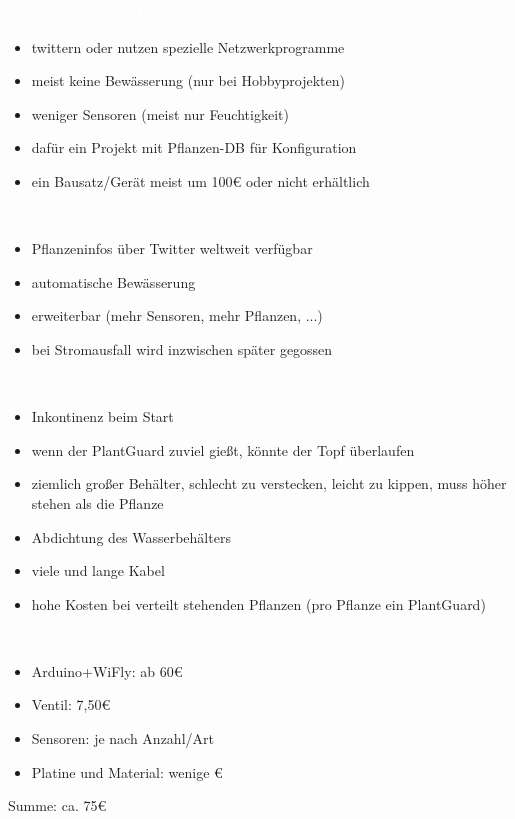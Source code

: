 \documentclass[bigger]{beamer}
\newcommand{\topic}[1]{{\huge{\textcolor{white}{\textbf{#1}}}}}
\begin{document}
\begin{frame}{\topic{Vergleich (andere Projekte)}}
	\begin{itemize}
		\item twittern oder nutzen spezielle Netzwerkprogramme
		\item meist keine Bewässerung (nur bei Hobbyprojekten)
		\item weniger Sensoren (meist nur Feuchtigkeit)
		\item dafür ein Projekt mit Pflanzen-DB für Konfiguration
		\item ein Bausatz/Gerät meist um {100\euro} oder nicht erhältlich
	\end{itemize}
\end{frame}

\begin{frame}{\topic{Vorteile des Plant Guard}}
	\begin{itemize}
		\item Pflanzeninfos über Twitter weltweit verfügbar
		\item automatische Bewässerung
		\item erweiterbar (mehr Sensoren, mehr Pflanzen, ...)
		\item bei Stromausfall wird inzwischen später gegossen
	\end{itemize}
\end{frame}

\begin{frame}{\topic{Probleme}}
	\begin{itemize}
		\item Inkontinenz beim Start
		\item wenn der PlantGuard zuviel gießt, könnte der Topf überlaufen
		\item ziemlich großer Behälter, schlecht zu verstecken, leicht zu kippen, muss höher stehen als die Pflanze
		\item Abdichtung des Wasserbehälters
		\item viele und lange Kabel
		\item hohe Kosten bei verteilt stehenden Pflanzen (pro Pflanze ein PlantGuard)
	\end{itemize}
\end{frame}

\begin{frame}{\topic{Kosten}}
	\begin{itemize}
		\item Arduino+WiFly: ab 60\euro
		\item Ventil: 7,50\euro
		\item Sensoren: je nach Anzahl/Art
		\item Platine und Material: wenige \euro
	\end{itemize}
	Summe: ca. 75\euro
\end{frame}
\end{document}

